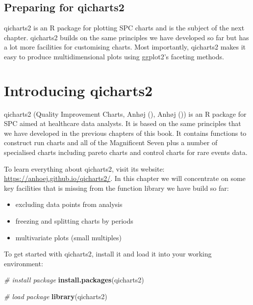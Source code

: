 \documentclass[
]{book}
\newenvironment{Shaded}{\begin{snugshade}}{\end{snugshade}}
\newcommand{\CommentTok}[1]{\textcolor[rgb]{0.56,0.35,0.01}{\textit{#1}}}
\newcommand{\FunctionTok}[1]{\textcolor[rgb]{0.13,0.29,0.53}{\textbf{#1}}}
\newcommand{\NormalTok}[1]{#1}
\newcommand{\StringTok}[1]{\textcolor[rgb]{0.31,0.60,0.02}{#1}}
\providecommand{\tightlist}{%
  \setlength{\itemsep}{0pt}\setlength{\parskip}{0pt}}
\begin{document}
\section{Preparing for qicharts2}\label{preparing-for-qicharts2}

qicharts2 is an R package for plotting SPC charts and is the subject of the next chapter. qicharts2 builds on the same principles we have developed so far but has a lot more facilities for customising charts. Most importantly, qicharts2 makes it easy to produce multidimensional plots using ggplot2's faceting methods.

\chapter{Introducing qicharts2}\label{qicharts}

qicharts2 (Quality Improvement Charts, Anhøj (), Anhøj ()) is an R package for SPC aimed at healthcare data analysts. It is based on the same principles that we have developed in the previous chapters of this book. It contains functions to construct run charts and all of the Magnificent Seven plus a number of specialised charts including pareto charts and control charts for rare events data.

To learn everything about qicharts2, visit its website: \url{https://anhoej.github.io/qicharts2/}. In this chapter we will concentrate on some key facilities that is missing from the function library we have build so far:

\begin{itemize}
\tightlist
\item
  excluding data points from analysis
\item
  freezing and splitting charts by periods
\item
  multivariate plots (small multiples)
\end{itemize}

To get started with qicharts2, install it and load it into your working environment:

\begin{Shaded}
\begin{Highlighting}[]
\CommentTok{\# install package}
\FunctionTok{install.packages}\NormalTok{(}\StringTok{\textquotesingle{}qicharts2\textquotesingle{}}\NormalTok{)}

\CommentTok{\# load package}
\FunctionTok{library}\NormalTok{(qicharts2)}
\end{Highlighting}
\end{Shaded}
\end{document}
